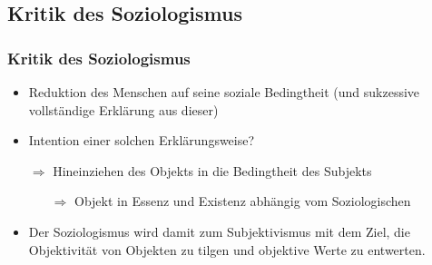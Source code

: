 \documentclass{beamer}
\begin{document}
\subsection{Kritik des Soziologismus}


\begin{frame}
\frametitle{Kritik des Soziologismus}


  \begin{itemize}
  \setlength{\itemsep}{10pt}
    \item Reduktion des Menschen auf seine soziale Bedingtheit (und sukzessive vollständige Erklärung aus dieser)

    \pause    
    
    \item Intention einer solchen Erklärungsweise?

    \pause
    
    \item[$\Rightarrow$] Hineinziehen des Objekts in die Bedingtheit des Subjekts
    \begin{itemize}
      \item[$\Rightarrow$] Objekt in Essenz und Existenz abhängig vom Soziologischen
    \end{itemize}
    
    \pause    
    
    \item Der Soziologismus wird damit zum Subjektivismus mit dem Ziel, die Objektivität von Objekten zu tilgen und objektive Werte zu entwerten. \parencite{Frankl1996}
  \end{itemize}

\end{frame}
\end{document}
